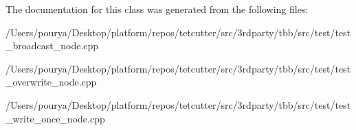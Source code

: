 The documentation for this class was generated from the following files\+:\begin{DoxyCompactItemize}
\item 
/\+Users/pourya/\+Desktop/platform/repos/tetcutter/src/3rdparty/tbb/src/test/test\+\_\+broadcast\+\_\+node.\+cpp\item 
/\+Users/pourya/\+Desktop/platform/repos/tetcutter/src/3rdparty/tbb/src/test/test\+\_\+overwrite\+\_\+node.\+cpp\item 
/\+Users/pourya/\+Desktop/platform/repos/tetcutter/src/3rdparty/tbb/src/test/test\+\_\+write\+\_\+once\+\_\+node.\+cpp\end{DoxyCompactItemize}
